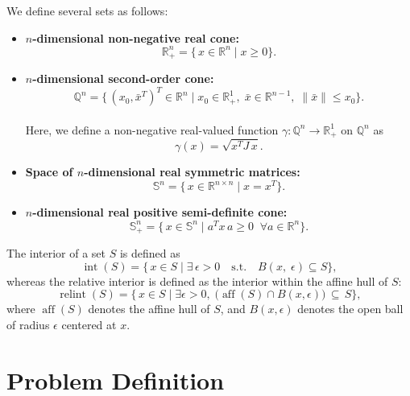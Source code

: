 \documentclass{scrartcl}
\begin{document}
We define several sets as follows:
\begin{itemize}
    \item 
    \textbf{$n$-dimensional non-negative real cone:} \\
    \[
      \mathbb{R}^n_+ 
      = \{\,x \in \mathbb{R}^n \mid x \geq 0 \}.
    \]

    \item 
    \textbf{$n$-dimensional second-order cone:} \\
    \[
      \mathbb{Q}^n 
      = \{\, (x_0, \bar{x}^T)^T \in \mathbb{R}^n 
         \mid x_0 \in \mathbb{R}^1_+, \; \bar{x} \in \mathbb{R}^{n-1}, \; \|\bar{x}\| \le x_0 \}.
    \]\\
    Here, we define a non-negative real-valued function $\gamma : \mathbb{Q}^n \to \mathbb{R}^1_+$ on $\mathbb{Q}^n$ as
    \[
      \gamma(x) = \sqrt{x^T J\, x}.
    \]

    \item 
    \textbf{Space of $n$-dimensional real symmetric matrices:} \\
    \[
      \mathbb{S}^n = \{\, x \in \mathbb{R}^{n \times n} \mid x = x^T \}.
    \]

    \item 
    \textbf{$n$-dimensional real positive semi-definite cone:} \\
    \[
      \mathbb{S}^n_+ 
      = \{\, x \in \mathbb{S}^n \mid a^T x\, a \ge 0 \;\; \forall a \in \mathbb{R}^n \}.
    \]
\end{itemize}

The interior of a set $S$ is defined as
\[
  \operatorname{int}(S) 
  = \{\, x \in S \mid \exists\, \epsilon > 0 \quad \text{s.t.} \quad B(x,\; \epsilon) \subseteq S \},
\]
whereas the relative interior is defined as the interior within the affine hull of $S$:
\[
\operatorname{relint}(S)
=\{\,
x \in S 
\mid \exists \epsilon>0,\; \bigl(\operatorname{aff}(S)\cap B(x,\epsilon)\bigr)\,\subseteq\,S
\},
\]
where $\operatorname{aff}(S)$ denotes the affine hull of $S$, and $B(x,\epsilon)$ denotes the open ball of radius $\epsilon$ centered at $x$.


\section{Problem Definition}
\end{document}
